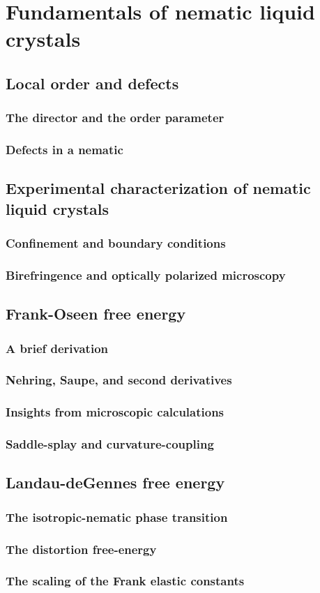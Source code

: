 \chapter{Fundamentals of nematic liquid crystals}

\section{Local order and defects}
\subsection{The director and the order parameter}
\subsection{Defects in a nematic}

\section{Experimental characterization of nematic liquid crystals}
\subsection{Confinement and boundary conditions}
\subsection{Birefringence and optically polarized microscopy}

\section{Frank-Oseen free energy}
\subsection{A brief derivation}
\subsection{Nehring, Saupe, and second derivatives}
\subsection{Insights from microscopic calculations}
\subsection{Saddle-splay and curvature-coupling}

\section{Landau-deGennes free energy}
\subsection{The isotropic-nematic phase transition}
\subsection{The distortion free-energy}
\subsection{The scaling of the Frank elastic constants}
